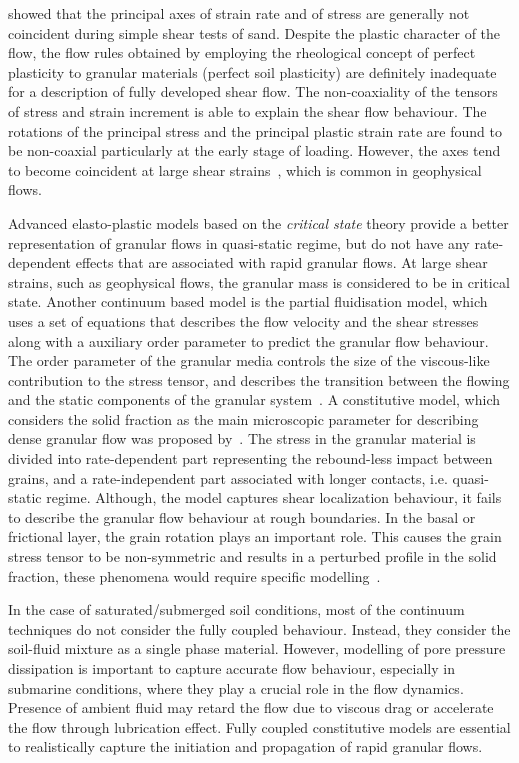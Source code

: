 \citet{Roscoe1970} showed that the principal axes of strain rate and of 
stress are generally not coincident during simple shear tests of sand. Despite 
the plastic character of the flow, the flow rules obtained by employing the 
rheological concept of perfect plasticity to granular materials (perfect soil 
plasticity) are definitely inadequate for a description of fully developed 
shear flow. The non-coaxiality of the tensors of stress and strain increment is 
able to explain the shear flow behaviour. The rotations of the principal stress 
and the principal plastic strain rate are found to be non-coaxial particularly 
at the early stage of loading. However, the axes tend 
to become coincident at large shear strains~\citep{Yu2006}, which is common in 
geophysical flows.

Advanced elasto-plastic models based on the \textit{critical state} theory
provide a better representation of granular flows in quasi-static regime, but 
do not have any rate-dependent effects that are associated with rapid granular 
flows. At large shear strains, such as geophysical flows, the granular mass is 
considered to be in critical state. Another continuum based model is the 
partial fluidisation model, which uses a set of equations that describes the 
flow velocity and the shear stresses along with a auxiliary order parameter to 
predict the granular flow behaviour. The order parameter of the granular media 
controls the size of the viscous-like contribution to the stress tensor, and 
describes the transition between the flowing and the static components of the 
granular system~\citep{Aranson2001}. A constitutive model, which considers the 
solid fraction as the main microscopic parameter for describing dense granular 
flow was proposed by~\citet{Josserand2004}. The stress in the granular material 
is divided into rate-dependent part representing the rebound-less impact 
between grains, and a rate-independent part associated with longer contacts, 
i.e. quasi-static regime. Although, the model captures shear localization 
behaviour, it fails to describe the granular flow behaviour at rough 
boundaries. In the basal or frictional layer, the grain rotation plays an 
important role. This causes the grain stress tensor to be non-symmetric and 
results in a perturbed profile in the solid fraction, these phenomena would 
require specific modelling~\citep{Josserand2004}.

In the case of saturated/submerged soil conditions, most of the continuum 
techniques do not consider the fully coupled behaviour. Instead, they consider 
the soil-fluid mixture as a single phase material. However, modelling of pore 
pressure dissipation is important to capture accurate flow behaviour, 
especially in submarine conditions, where they play a crucial role in the flow 
dynamics. Presence of ambient fluid may retard the flow due to viscous drag or 
accelerate the flow through lubrication effect. Fully coupled constitutive 
models are essential to realistically capture the initiation and propagation of 
rapid granular flows.

